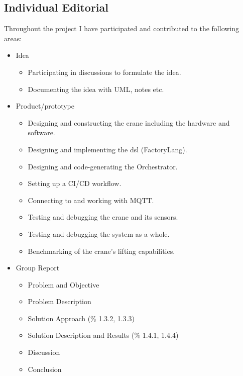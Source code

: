 \subsection*{Individual Editorial}

Throughout the project I have participated and contributed to the following areas:

\begin{itemize}
    \item Idea
    \begin{itemize}
        \item Participating in discussions to formulate the idea.
        \item Documenting the idea with UML, notes etc.
    \end{itemize}
    \item Product/prototype
    \begin{itemize}
        \item Designing and constructing the crane including the hardware and software.
        \item Designing and implementing the \acrshort{dsl} (FactoryLang).
        \item Designing and code-generating the Orchestrator.
        \item Setting up a CI/CD workflow.
        \item Connecting to and working with MQTT.
        \item Testing and debugging the crane and its sensors.
        \item Testing and debugging the system as a whole.
        \item Benchmarking of the crane's lifting capabilities.
    \end{itemize}
    \item Group Report
    \begin{itemize}
        \item Problem and Objective
        \item Problem Description
        \item Solution Approach (\% 1.3.2, 1.3.3)
        \item Solution Description and Results (\% 1.4.1, 1.4.4)
        \item Discussion
        \item Conclusion
    \end{itemize}
\end{itemize}